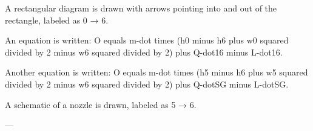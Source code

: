 A rectangular diagram is drawn with arrows pointing into and out of the rectangle, labeled as 0 → 6.  

An equation is written:  
O equals m-dot times (h0 minus h6 plus w0 squared divided by 2 minus w6 squared divided by 2) plus Q-dot16 minus L-dot16.  

Another equation is written:  
O equals m-dot times (h5 minus h6 plus w5 squared divided by 2 minus w6 squared divided by 2) plus Q-dotSG minus L-dotSG.  

A schematic of a nozzle is drawn, labeled as 5 → 6.

---